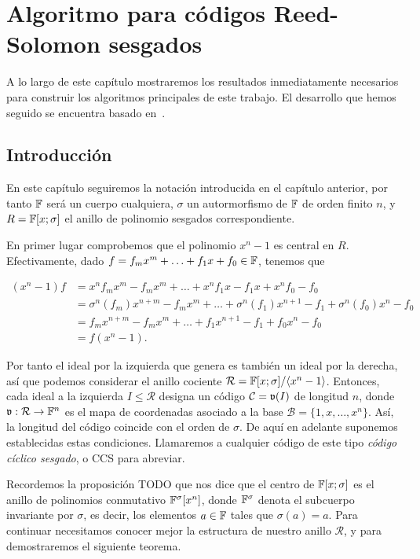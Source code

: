 \chapter{Algoritmo para códigos Reed-Solomon sesgados}%
\label{chap:algoritmo}

A lo largo de este capítulo mostraremos los resultados inmediatamente necesarios para construir los algoritmos principales de este trabajo. El desarrollo que hemos seguido se encuentra basado en~\cite{sugi}.

\section{Introducción}

En este capítulo seguiremos la notación introducida en el capítulo anterior, por tanto \(\mathbb{F}\) será un cuerpo cualquiera,  \(\sigma\) un autormorfismo de  \(\mathbb{F}\) de orden finito  \(n\), y \(R = \mathbb{F}[x;\sigma]\) el anillo de polinomio sesgados correspondiente.

En primer lugar comprobemos que el polinomio \(x^n -1\) es central en \(R\). Efectivamente, dado \(f = f_m x^m + \ldots + f_1x + f_0 \in \mathbb{F}\), tenemos que

\[
\begin{aligned}
(x^n-1)f &= x^n f_m x^m - f_m x^m + \dots + x^n f_1 x - f_1 x + x^n f_0 - f_0 \\
&= \sigma^n(f_m)x^{n+m} - f_m x^m + \dots + \sigma^n(f_1)x^{n+1} - f_1 + \sigma^n(f_0)x^n - f_0\\
&= f_mx^{n+m} - f_m x^m + \dots + f_1x^{n+1} - f_1 + f_0x^n - f_0\\
&= f(x^n -1).
\end{aligned}
\]

Por tanto el ideal por la izquierda que genera es también un ideal por la derecha, así que podemos considerar el anillo cociente \(\mathcal{R} = \mathbb{F}[x;\sigma] / \langle x^n -1 \rangle\). Entonces, cada ideal a la izquierda \(I \leq \mathcal{R}\) designa un código \(\mathcal{C} =\mathfrak{v}(I)\) de longitud  \(n\), donde \(\mathfrak{v}:\mathcal{R} \rightarrow \mathbb{F}^n\) es el mapa de coordenadas asociado a la base \(\mathcal{B} = \{1, x, \dots, x^n\}\). Así, la longitud del código coincide con el orden de \(\sigma\). De aquí en adelante suponemos establecidas estas condiciones. Llamaremos a cualquier código de este tipo \textit{código cíclico sesgado}, o CCS para abreviar.

Recordemos la proposición TODO que nos dice que el centro de \(\mathbb{F}[x;\sigma]\) es el anillo de polinomios conmutativo  \(\mathbb{F}^\sigma[x^n]\), donde  \(\mathbb{F}^\sigma\) denota el subcuerpo invariante por  \(\sigma\), es decir, los elementos  \(a \in \mathbb{F}\) tales que  \(\sigma(a) = a\). Para continuar necesitamos conocer mejor la estructura de nuestro anillo \(\mathcal{R}\), y para demostraremos el siguiente teorema.

